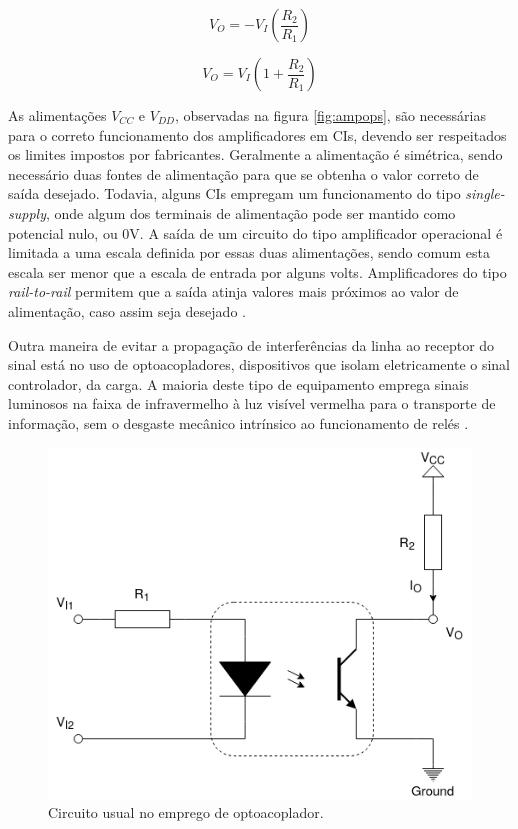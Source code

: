 \begin{equation}
    \label{eq:ampop1}
    V_O = -V_I\left(\frac{R_2}{R_1}\right)
\end{equation}

\begin{equation}
    \label{eq:ampop2}
    V_O = V_I\left(1+\frac{R_2}{R_1}\right)
\end{equation}

As alimentações $V_{CC}$ e $V_{DD}$, observadas na figura \ref{fig:ampops},
são necessárias para o correto funcionamento dos amplificadores em CIs, 
devendo ser respeitados os limites impostos por fabricantes. 
Geralmente a alimentação é simétrica, sendo necessário duas 
fontes de alimentação para que se obtenha o valor correto de saída 
desejado. Todavia, alguns CIs empregam um funcionamento do tipo 
\textit{single-supply}, onde algum dos terminais de alimentação pode 
ser mantido como potencial nulo, ou 0V.
A saída de um circuito do tipo amplificador operacional é limitada 
a uma escala definida por essas duas alimentações, sendo comum esta
escala ser menor que a escala de entrada por alguns volts. 
Amplificadores do tipo \textit{rail-to-rail} permitem que a saída atinja valores mais 
próximos ao valor de alimentação, caso assim seja desejado \cite{mancini2003op}.

Outra maneira de evitar a propagação de interferências da linha ao 
receptor do sinal está no uso de optoacopladores, dispositivos que 
isolam eletricamente o sinal controlador, da carga. A maioria deste 
tipo de equipamento emprega sinais luminosos na faixa de infravermelho 
à luz visível vermelha para o transporte de informação, sem o desgaste
mecânico intrínsico ao funcionamento de relés \cite{temis1996optocouplers}.

\begin{figure}[h]
    \caption{Circuito usual no emprego de optoacoplador.}    
    
    \begin{centering}
        \includegraphics[width=0.6\columnwidth]{images/fundamentos/Optocoupler.png}
    \par\end{centering}

    \label{fig:opto}
\end{figure}


